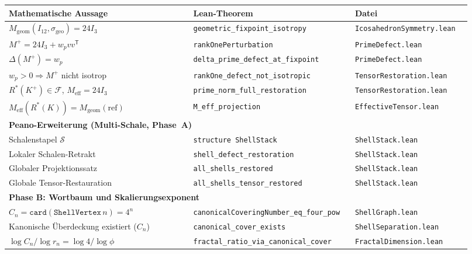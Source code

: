 \documentclass[11pt,a4paper]{article}
\begin{document}
	\begin{table}[h!]
		\centering
		\small
		\begin{tabular}{p{0.38\linewidth}p{0.30\linewidth}p{0.24\linewidth}}
			\hline
			\textbf{Mathematische Aussage} & \textbf{Lean-Theorem} & \textbf{Datei} \\
			\hline
			$M_{\mathrm{geom}}(I_{12},\sigma_{\mathrm{geo}})=24I_3$
			& \texttt{geometric\_fixpoint\_isotropy} & \texttt{IcosahedronSymmetry.lean} \\
			$M^+=24I_3+w_pvv^{\mathsf T}$
			& \texttt{rankOnePerturbation} & \texttt{PrimeDefect.lean} \\
			$\Delta(M^+)=w_p$
			& \texttt{delta\_prime\_defect\_at\_fixpoint} & \texttt{PrimeDefect.lean} \\
			$w_p>0\Rightarrow M^+$ nicht isotrop
			& \texttt{rankOne\_defect\_not\_isotropic} & \texttt{TensorRestoration.lean} \\
			$R^*(K^+)\in\mathcal{F}$, $M_{\mathrm{eff}}=24I_3$
			& \texttt{prime\_norm\_full\_restoration} & \texttt{TensorRestoration.lean} \\
			$M_{\mathrm{eff}}(R^*(K))=M_{\mathrm{geom}}(\mathrm{ref})$
			& \texttt{M\_eff\_projection} & \texttt{EffectiveTensor.lean} \\
			\hline
			\multicolumn{3}{l}{\textbf{Peano-Erweiterung (Multi-Schale, Phase~A)}} \\
			\hline
			Schalenstapel $\mathcal{S}$
			& \texttt{structure ShellStack} & \texttt{ShellStack.lean} \\
			Lokaler Schalen-Retrakt
			& \texttt{shell\_defect\_restoration} & \texttt{ShellStack.lean} \\
			Globaler Projektionssatz
			& \texttt{all\_shells\_restored} & \texttt{ShellStack.lean} \\
			Globale Tensor-Restauration
			& \texttt{all\_shells\_tensor\_restored} & \texttt{ShellStack.lean} \\
			\hline
			\multicolumn{3}{l}{\textbf{Phase B: Wortbaum und Skalierungsexponent}} \\
			\hline
			$C_n=\texttt{card}(\texttt{ShellVertex}\,n)=4^n$
			& \texttt{canonicalCoveringNumber\_eq\_four\_pow} & \texttt{ShellGraph.lean} \\
			Kanonische Überdeckung existiert ($C_n$)
			& \texttt{canonical\_cover\_exists} & \texttt{ShellSeparation.lean} \\
			$\log C_n/\log r_n=\log4/\log\phi$
			& \texttt{fractal\_ratio\_via\_canonical\_cover} & \texttt{FractalDimension.lean} \\

\end{tabular}
\end{table}
\end{document}
